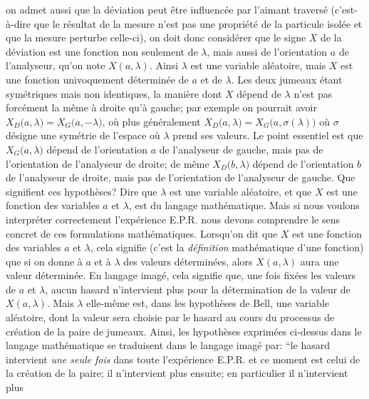 on admet aussi que la d\'eviation peut \^etre influenc\'ee par l'aimant 
travers\'e (c'est-\`a-dire que le r\'esultat de  la mesure n'est pas une 
propri\'et\'e de la particule isol\'ee et que la mesure perturbe celle-ci), 
on doit donc consid\'erer que le signe $X$ de  la d\'eviation est une  
fonction non seulement de $\lambda$, mais aussi de l'orientation $a$  
de l'analyseur, qu'on note $X(a,\lambda )$. Ainsi $\lambda$ est une  
variable al\'eatoire, mais $X$ est une fonction univoquement  
d\'etermin\'ee de $a$ et de $\lambda$. Les deux jumeaux \'etant  
sym\'etriques mais non identiques, la mani\`ere dont $X$ d\'epend de 
$\lambda$ n'est pas forc\'ement la m\^eme \`a  droite qu'\`a gauche;  
par exemple on pourrait avoir $X_D\big( a,\lambda\big) = X_G \big( 
a,-\lambda\big)$, o\`u plus g\'en\'eralement $X_D\big( a,\lambda \big)  
= X_G\big( a,\sigma(\lambda )\big)$ o\`u $\sigma$ d\'esigne une   
sym\'etrie de l'espace o\`u  $\lambda$ prend  ses valeurs. Le point 
essentiel est que  $X_G\big( a,\lambda \big)$ d\'epend de l'orientation  
$a$ de l'analyseur de gauche, mais pas de l'orientation de l'analyseur de 
droite;  de m\^eme $X_D\big( b,\lambda \big)$ d\'epend de l'orientation 
$b$ de l'analyseur de droite,  mais pas  de l'orientation de l'analyseur de 
gauche.    
\medskip 
Que signifient ces hypoth\`eses? Dire que $\lambda$ est une variable  
al\'eatoire, et que $X$ est une fonction des variables $a$ et $\lambda$, 
est du langage math\'ematique. Mais si nous voulons interpr\'eter 
correctement l'exp\'erience E.P.R. nous devons comprendre le sens 
concret de ces formulations math\'ematiques. Lorsqu'on dit que  
$X$ est une fonction des variables $a$ et $\lambda$, cela signifie  (c'est 
la {\it d\'efinition} math\'ematique d'une fonction) que si on donne \`a  
 $a$  et \`a $\lambda$ des valeurs d\'etermin\'ees, alors $X(a,\lambda )$ 
aura une valeur d\'etermin\'ee. En langage imag\'e, cela signifie que, une 
fois fix\'ees les valeurs de $a$ et $\lambda$, aucun hasard n'intervient 
plus pour la d\'etermination de la valeur de $X(a,\lambda )$. Mais 
$\lambda$ elle-m\^eme est, dans les hypoth\`eses de Bell, une variable 
al\'eatoire,  dont la valeur sera choisie par le hasard au cours du 
processus de cr\'eation de la paire de jumeaux. Ainsi, les hypoth\`eses 
exprim\'ees ci-dessus dans le langage math\'ematique se traduisent dans 
le langage imag\'e par: ``le hasard intervient {\it une seule fois} dans  
toute l'exp\'erience E.P.R. et ce moment est celui de la cr\'eation de la 
paire; il n'intervient plus ensuite; en particulier il n'intervient plus 
